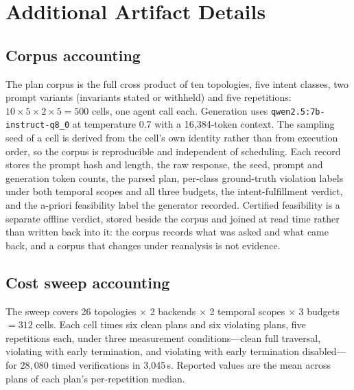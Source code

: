 \section{Additional Artifact Details}
\label{app:artifacts}

\subsection{Corpus accounting}

The plan corpus is the full cross product of ten topologies, five intent
classes, two prompt variants (invariants stated or withheld) and five
repetitions: \(10\times5\times2\times5=500\) cells, one agent call each.
Generation uses \texttt{qwen2.5:7b-instruct-q8\_0} at temperature $0.7$ with
a 16{,}384-token context. The sampling seed of a cell is derived from the
cell's own identity rather than from execution order, so the corpus is
reproducible and independent of scheduling. Each record stores the prompt
hash and length, the raw response, the seed, prompt and generation token
counts, the parsed plan, per-class ground-truth violation labels under both
temporal scopes and all three budgets, the intent-fulfillment verdict, and
the a-priori feasibility label the generator recorded. Certified feasibility
is a separate offline verdict, stored beside the corpus and joined at read
time rather than written back into it: the corpus records what was asked and
what came back, and a corpus that changes under reanalysis is not evidence.

\subsection{Cost sweep accounting}

The sweep covers 26 topologies $\times$ 2 backends $\times$ 2 temporal
scopes $\times$ 3 budgets $=312$ cells. Each cell times six clean plans and
six violating plans, five repetitions each, under three measurement
conditions---clean full traversal, violating with early termination, and
violating with early termination disabled---for \(28{,}080\) timed
verifications in 3{,}045\,s. Reported values are the mean across plans of
each plan's per-repetition median.

